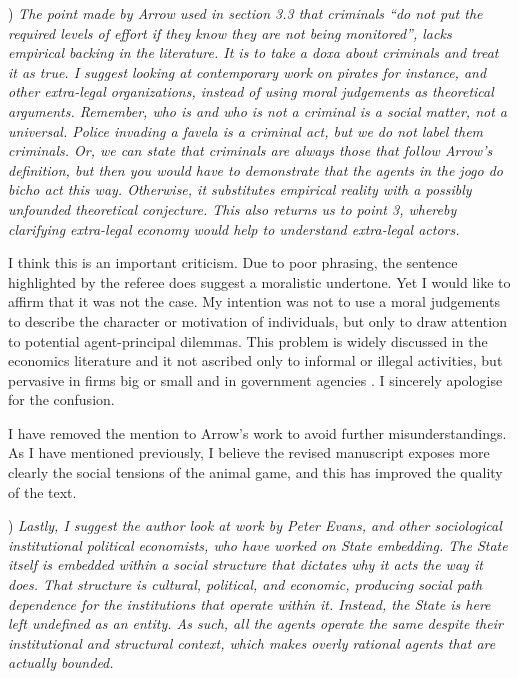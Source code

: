 \documentclass[a4paper,12pt]{article}
\begin{document}
\vspace{.5cm}

) \textit{The point made by Arrow used in section 3.3 that criminals ``do not put the required levels of effort if they know they are not being monitored'', lacks empirical backing in the literature. It is to take a doxa about criminals and treat it as true. I suggest looking at contemporary work on pirates for instance, and other extra-legal organizations, instead of using moral judgements as theoretical arguments. Remember, who is and who is not a criminal is a social matter, not a universal. Police invading a favela is a criminal act, but we do not label them criminals. Or, we can state that criminals are always those that follow Arrow's definition, but then you would have to demonstrate that the agents in the jogo do bicho act this way. Otherwise, it substitutes empirical reality with a possibly unfounded theoretical conjecture. This also returns us to point 3, whereby clarifying extra-legal economy would help to understand extra-legal actors.} 

\vspace{.25cm}

I think this is an important criticism. Due to poor phrasing, the sentence highlighted by the referee does suggest a moralistic undertone. Yet I would like to affirm that it was not the case. My intention was not to use a moral judgements to describe the character or motivation of individuals, but only to draw attention to potential agent-principal dilemmas. This problem is widely discussed in the economics literature and it not ascribed only to informal or illegal activities, but pervasive in firms big or small and in government agencies \citep[e.g.,][]{grossman1983analysis,laffont2009theory,sappington1991incentives}. I sincerely apologise for the confusion.

I have removed the mention to Arrow's work to avoid further misunderstandings. As I have mentioned previously, I believe the revised manuscript exposes more clearly the social tensions of the animal game, and this has improved the quality of the text. 

\vspace{.5cm}

) \textit{Lastly, I suggest the author look at work by Peter Evans, and other sociological institutional political economists, who have worked on State embedding. The State itself is embedded within a social structure that dictates why it acts the way it does. That structure is cultural, political, and economic, producing social path dependence for the institutions that operate within it. Instead, the State is here left undefined as an entity. As such, all the agents operate the same despite their institutional and structural context, which makes overly rational agents that are actually bounded.}
\end{document}
